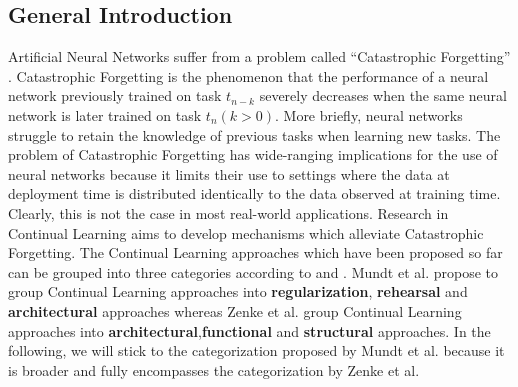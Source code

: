 \subsection{General Introduction}
Artificial Neural Networks suffer from a problem called \enquote{Catastrophic Forgetting} \cite{mccloskey1989catastrophic}.
Catastrophic Forgetting is the phenomenon that the performance of a neural network previously trained on task $t_{n-k}$
severely decreases when the same neural network is later trained on task $t_n (k>0)$. More briefly, neural networks struggle
to retain the knowledge of previous tasks when learning new tasks. The problem of Catastrophic Forgetting has wide-ranging
implications for the use of neural networks because it limits their use to settings where the data at deployment time is
distributed identically to the data observed at training time. Clearly, this is not the case in most real-world applications.
Research in Continual Learning aims to develop mechanisms which alleviate Catastrophic Forgetting. The Continual Learning approaches
which have been proposed so far can be grouped into three categories according to \cite{mundt2020wholistic} and
\cite{zenke2017continual}. Mundt et al. \cite{mundt2020wholistic} propose to group Continual Learning approaches into
\textbf{regularization}, \textbf{rehearsal} and \textbf{architectural} approaches whereas Zenke et al. \cite{zenke2017continual}
group Continual Learning approaches into \textbf{architectural},\textbf{functional} and \textbf{structural} approaches. In the
following, we will stick to the categorization proposed by Mundt et al. because it is broader and fully encompasses the
categorization by Zenke et al.
